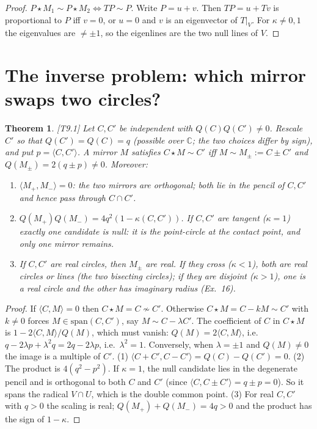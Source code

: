 \documentclass[11pt]{article}
\newtheorem{theorem}{Theorem}[section]\newtheorem{proposition}[theorem]{Proposition}
\theoremstyle{definition}\newtheorem{definition}[theorem]{Definition}\newtheorem{remark}[theorem]{Remark}\newtheorem{example}[theorem]{Example}
\newcommand{\C}{\mathbb{C}}\newcommand{\R}{\mathbb{R}}\newcommand{\PP}{\mathbb{P}}
\newcommand{\ip}[2]{\langle #1,#2\rangle}\newcommand{\pt}{\mathrm{pt}}\newcommand{\Qd}{\mathcal{Q}}
\newcommand{\chk}[1]{\hfill{\footnotesize\textsf{[#1]}}}
\begin{document}
\begin{proof} $P\star M_1\sim P\star M_2\iff TP\sim P$. Write $P=u+v$. Then $TP=u+Tv$ is proportional to $P$ iff $v=0$, or $u=0$ and $v$ is an eigenvector of $T|_V$. For $\kappa\neq0,1$ the eigenvalues are $\ne\pm1$, so the eigenlines are the two null lines of $V$. \end{proof}

\section{The inverse problem: which mirror swaps two circles?}\label{sec:inverse}
\begin{theorem}\label{thm:inverse}\chk{T9.1}
Let $C,C'$ be independent with $Q(C)Q(C')\neq0$. Rescale $C'$ so that $Q(C')=Q(C)=q$ (possible over $\C$; the two choices differ by sign), and put $p=\ip C{C'}$. A mirror $M$ satisfies $C\star M\sim C'$ iff $M\sim M_\pm:=C\pm C'$ and $Q(M_\pm)=2(q\pm p)\neq0$. Moreover:
\begin{enumerate}
\item $\ip{M_+}{M_-}=0$: the two mirrors are orthogonal; both lie in the pencil of $C,C'$ and hence pass through $C\cap C'$.
\item $Q(M_+)Q(M_-)=4q^2(1-\kappa(C,C'))$. If $C,C'$ are tangent ($\kappa=1$) exactly one candidate is null: it is the point-circle at the contact point, and only one mirror remains.
\item If $C,C'$ are real circles, then $M_\pm$ are real. If they cross ($\kappa<1$), both are real circles or lines (the two bisecting circles); if they are disjoint ($\kappa>1$), one is a real circle and the other has \emph{imaginary radius} (Ex.~16).
\end{enumerate}
\end{theorem}
\begin{proof}
If $\ip CM=0$ then $C\star M=C\not\sim C'$. Otherwise $C\star M=C-kM\sim C'$ with $k\ne0$ forces $M\in\mathrm{span}(C,C')$, say $M\sim C-\lambda C'$. The coefficient of $C$ in $C\star M$ is $1-2\ip CM/Q(M)$, which must vanish: $Q(M)=2\ip CM$, i.e.\ $q-2\lambda p+\lambda^2q=2q-2\lambda p$, i.e.\ $\lambda^2=1$. Conversely, when $\lambda=\pm1$ and $Q(M)\ne0$ the image is a multiple of $C'$. (1) $\ip{C+C'}{C-C'}=Q(C)-Q(C')=0$. (2) The product is $4(q^2-p^2)$. If $\kappa=1$, the null candidate lies in the degenerate pencil and is orthogonal to both $C$ and $C'$ (since $\ip C{C\pm C'}=q\pm p=0$). So it spans the radical $V\cap U$, which is the double common point. (3) For real $C,C'$ with $q>0$ the scaling is real; $Q(M_+)+Q(M_-)=4q>0$ and the product has the sign of $1-\kappa$.
\end{proof}
\end{document}
